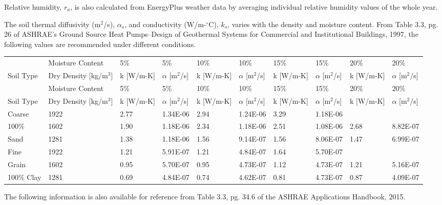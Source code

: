 Relative humidity, \(r_{a}\), is also calculated from EnergyPlus weather data by averaging individual relative humidity values of the whole year.

The soil thermal diffusivity (m\(^{2}\)/s), \({\alpha_{s}}\), and conductivity (W/m-\(^{\circ}\)C), \(k_{s}\), varies with the density and moisture content. From Table 3.3, pg. 26 of ASHRAE's Ground Source Heat Pumps--Design of Geothermal Systems for Commercial and Institutional Buildings, 1997, the following values are recommended under different conditions.

{\scriptsize
\begin{longtable}[c]{>{\raggedright}p{0.55in}>{\raggedright}p{0.55in}>{\raggedright}p{0.55in}>{\raggedright}p{0.55in}>{\raggedright}p{0.55in}>{\raggedright}p{0.55in}>{\raggedright}p{0.55in}>{\raggedright}p{0.55in}>{\raggedright}p{0.55in}>{\raggedright}p{0.55in}}
\toprule
 & Moisture Content & 5\% & 5\% & 10\% & 10\% & 15\% & 15\% & 20\% & 20\% \tabularnewline
Soil Type & Dry Density  [kg/m\(^3\)] & k  [W/m-K] & \({\alpha}\)   [m\(^2\)/s] & k  [W/m-K] & \({\alpha}\)   [m\(^2\)/s] & k  [W/m-K] & \({\alpha}\)   [m\(^2\)/s] & k  [W/m-K] & \({\alpha}\)   [m\(^2\)/s] \tabularnewline
\midrule
\endfirsthead

\toprule
 & Moisture Content & 5\% & 5\% & 10\% & 10\% & 15\% & 15\% & 20\% & 20\% \tabularnewline
Soil Type & Dry Density  [kg/m\(^3\)] & k  [W/m-K] & \({\alpha}\)   [m\(^2\)/s] & k  [W/m-K] & \({\alpha}\)   [m\(^2\)/s] & k  [W/m-K] & \({\alpha}\)   [m\(^2\)/s] & k  [W/m-K] & \({\alpha}\)   [m\(^2\)/s] \tabularnewline
\midrule
\endhead

Coarse & 1922 & 2.77 & 1.34E-06 & 2.94 & 1.24E-06 & 3.29 & 1.18E-06 &  &  \tabularnewline
100\% & 1602 & 1.90 & 1.18E-06 & 2.34 & 1.18E-06 & 2.51 & 1.08E-06 & 2.68 & 8.82E-07 \tabularnewline
Sand & 1281 & 1.38 & 1.18E-06 & 1.56 & 9.14E-07 & 1.56 & 8.06E-07 & 1.47 & 6.99E-07 \tabularnewline
\midrule
Fine & 1922 & 1.21 & 5.91E-07 & 1.21 & 4.84E-07 & 1.64 & 5.70E-07 &  &  \tabularnewline
Grain & 1602 & 0.95 & 5.70E-07 & 0.95 & 4.73E-07 & 1.12 & 4.73E-07 & 1.21 & 5.16E-07 \tabularnewline
100\% Clay & 1281 & 0.69 & 4.84E-07 & 0.74 & 4.62E-07 & 0.81 & 4.73E-07 & 0.87 & 4.09E-07 \tabularnewline
\bottomrule
\end{longtable}}

The following information is also available for reference from Table 3.3, pg. 34.6 of the ASHRAE Applications Handbook, 2015.

